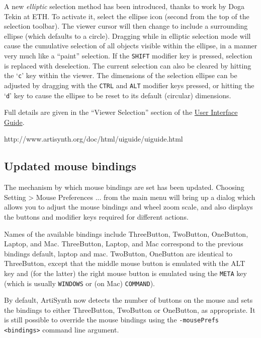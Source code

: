 \documentclass{article}
\begin{document}
A new {\it elliptic} selection method has been introduced, thanks to
work by Doga Tekin at ETH. To activate it, select the ellipse icon
(second from the top of the selection toolbar). The viewer cursor will
then change to include a surrounding ellipse (which defaults to a
circle). Dragging while in elliptic selection mode will cause the
cumulative selection of all objects visible within the ellipse, in a
manner very much like a ``paint'' selection. If the {\tt SHIFT}
modifier key is pressed, selection is replaced with deselection. The
current selection can also be cleared by hitting the `{\tt c}' key
within the viewer. The dimensions of the selection ellipse can be
adjusted by dragging with the {\tt CTRL} and {\tt ALT} modifier keys
pressed, or hitting the `{\tt d}' key to cause the ellipse to be reset
to its default (circular) dimensions.

Full details are given in the ``Viewer Selection'' section of the
\href{http://www.artisynth.org/doc/html/uiguide/uiguide.html} {User
Interface Guide}.

http://www.artisynth.org/doc/html/uiguide/uiguide.html

\subsection*{Updated mouse bindings}

The mechanism by which mouse bindings are set has been updated.
Choosing {\sf Setting > Mouse Preferences ...} from the main menu will
bring up a dialog which allows you to adjust the mouse bindings and
wheel zoom scale, and also displays the buttons and modifier keys
required for different actions.

Names of the available bindings include {\sf ThreeButton}, {\sf
TwoButton}, {\sf OneButton}, {\sf Laptop}, and {\sf Mac}.  {\sf
ThreeButton}, {\sf Laptop}, and {\sf Mac} correspond to the previous
bindings {\sf default}, {\sf laptop} and {\sf mac}.  {\sf TwoButton},
{\sf OneButton} are identical to {\sf ThreeButton}, except that the
middle mouse button is emulated with the {\sf ALT} key and (for the
latter) the right mouse button is emulated using the {\tt META} key
(which is usually {\tt WINDOWS} or (on Mac) {\tt COMMAND}).

By default, ArtiSynth now detects the number of buttons on the mouse
and sets the bindings to either {\sf ThreeButton}, {\sf TwoButton} or
{\sf OneButton}, as appropriate. It is still possible to override the
mouse bindings using the {\tt -mousePrefs <bindings>} command line
argument.
\end{document}
